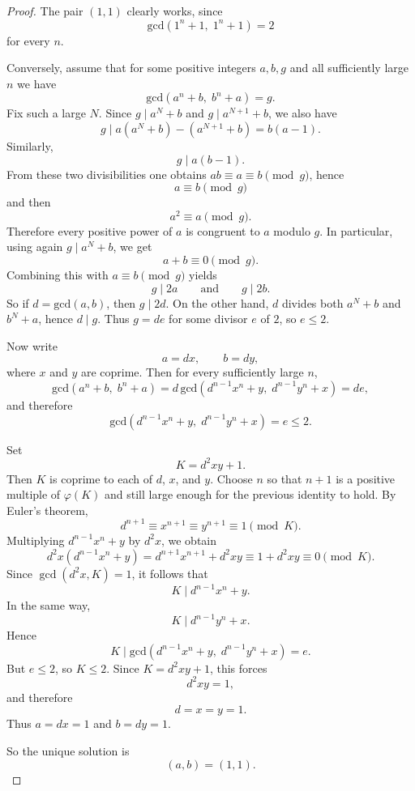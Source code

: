 \begin{proof}
The pair \((1,1)\) clearly works, since
\[
  \text{gcd}(1^n+1,\;1^n+1)=2
\]
for every \(n\).

Conversely, assume that for some positive integers \(a,b,g\) and all
sufficiently large \(n\) we have
\[
  \text{gcd}(a^n+b,\;b^n+a)=g.
\]
Fix such a large \(N\). Since \(g\mid a^N+b\) and \(g\mid a^{N+1}+b\), we also
have
\[
  g \mid a(a^N+b)-(a^{N+1}+b)=b(a-1).
\]
Similarly,
\[
  g \mid a(b-1).
\]
From these two divisibilities one obtains \(ab\equiv a\equiv b\pmod g\), hence
\[
  a \equiv b \pmod g
\]
and then
\[
  a^2 \equiv a \pmod g.
\]
Therefore every positive power of \(a\) is congruent to \(a\) modulo \(g\). In
particular, using again \(g\mid a^N+b\), we get
\[
  a+b \equiv 0 \pmod g.
\]
Combining this with \(a\equiv b \pmod g\) yields
\[
  g \mid 2a
  \qquad\text{and}\qquad
  g \mid 2b.
\]
So if \(d=\text{gcd}(a,b)\), then \(g\mid 2d\). On the other hand, \(d\) divides both
\(a^N+b\) and \(b^N+a\), hence \(d\mid g\). Thus \(g=d e\) for some divisor
\(e\) of \(2\), so \(e\le 2\).

Now write
\[
  a=dx,\qquad b=dy,
\]
where \(x\) and \(y\) are coprime. Then for every sufficiently large \(n\),
\[
  \text{gcd}(a^n+b,\;b^n+a)
  = d\,\text{gcd}(d^{n-1}x^n+y,\; d^{n-1}y^n+x)
  = d e,
\]
and therefore
\[
  \text{gcd}(d^{n-1}x^n+y,\; d^{n-1}y^n+x)=e\le 2.
\]

Set
\[
  K=d^2xy+1.
\]
Then \(K\) is coprime to each of \(d\), \(x\), and \(y\). Choose \(n\) so that
\(n+1\) is a positive multiple of \(\varphi(K)\) and still large enough for the
previous identity to hold. By Euler's theorem,
\[
  d^{n+1}\equiv x^{n+1}\equiv y^{n+1}\equiv 1 \pmod K.
\]
Multiplying \(d^{n-1}x^n+y\) by \(d^2x\), we obtain
\[
  d^2x(d^{n-1}x^n+y)=d^{n+1}x^{n+1}+d^2xy \equiv 1+d^2xy \equiv 0 \pmod K.
\]
Since \(\gcd(d^2x,K)=1\), it follows that
\[
  K \mid d^{n-1}x^n+y.
\]
In the same way,
\[
  K \mid d^{n-1}y^n+x.
\]
Hence
\[
  K \mid \text{gcd}(d^{n-1}x^n+y,\; d^{n-1}y^n+x)=e.
\]
But \(e\le 2\), so \(K\le 2\). Since \(K=d^2xy+1\), this forces
\[
  d^2xy=1,
\]
and therefore
\[
  d=x=y=1.
\]
Thus \(a=dx=1\) and \(b=dy=1\).

So the unique solution is
\[
  (a,b)=(1,1).
\]
\end{proof}
